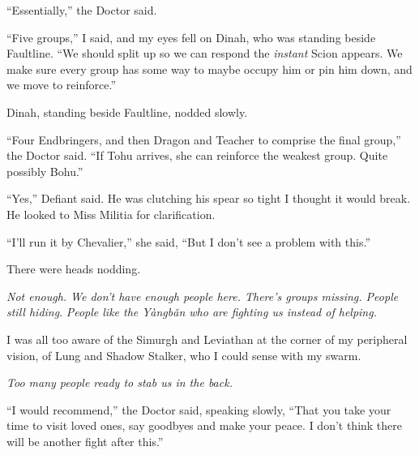 ``Essentially,'' the Doctor said.



``Five groups,'' I said, and my eyes fell on Dinah, who was standing beside Faultline.  ``We should split up so we can respond the \emph{instant} Scion appears.  We make sure every group has some way to maybe occupy him or pin him down, and we move to reinforce.''



Dinah, standing beside Faultline, nodded slowly.



``Four Endbringers, and then Dragon and Teacher to comprise the final group,'' the Doctor said.  ``If Tohu arrives, she can reinforce the weakest group.  Quite possibly Bohu.''



``Yes,'' Defiant said.  He was clutching his spear so tight I thought it would break.  He looked to Miss Militia for clarification.



``I'll run it by Chevalier,'' she said, ``But I don't see a problem with this.''



There were heads nodding.



\emph{Not enough.  We don't have enough people here.  There's groups missing.  People still hiding}.  \emph{People like the Y\`{a}ngb\v{a}n who are fighting us instead of helping.}



I was all too aware of the Simurgh and Leviathan at the corner of my peripheral vision, of Lung and Shadow Stalker, who I could sense with my swarm.



\emph{Too many people ready to stab us in the back.}



``I would recommend,'' the Doctor said, speaking slowly, ``That you take your time to visit loved ones, say goodbyes and make your peace.  I don't think there will be another fight after this.''





